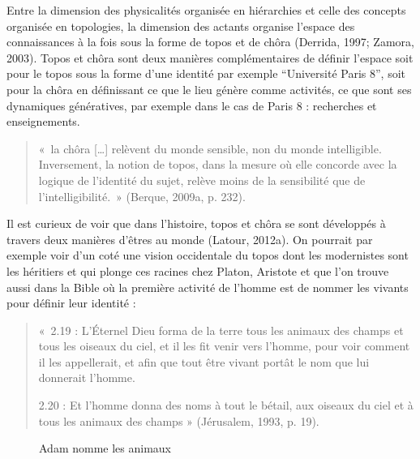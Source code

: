 \documentclass[
  a4paper,
  DIV=11,
  numbers=noendperiod]{scrreprt}
\begin{document}
Entre la dimension des physicalités organisée en hiérarchies et celle
des concepts organisée en topologies, la dimension des actants organise
l'espace des connaissances à la fois sous la forme de topos et de chôra
(Derrida, 1997; Zamora, 2003). Topos et chôra sont deux manières
complémentaires de définir l'espace soit pour le topos sous la forme
d'une identité par exemple ``Université Paris 8'', soit pour la chôra en
définissant ce que le lieu génère comme activités, ce que sont ses
dynamiques génératives, par exemple dans le cas de Paris 8 : recherches
et enseignements.

\begin{quote}
«~la chôra {[}\ldots{]} relèvent du monde sensible, non du monde
intelligible. Inversement, la notion de topos, dans la mesure où elle
concorde avec la logique de l'identité du sujet, relève moins de la
sensibilité que de l'intelligibilité.~» (Berque, 2009a, p. 232).
\end{quote}

Il est curieux de voir que dans l'histoire, topos et chôra se sont
développés à travers deux manières d'êtres au monde (Latour, 2012a). On
pourrait par exemple voir d'un coté une vision occidentale du topos dont
les modernistes sont les héritiers et qui plonge ces racines chez
Platon, Aristote et que l'on trouve aussi dans la Bible où la première
activité de l'homme est de nommer les vivants pour définir leur identité
:

\begin{quote}
«~2.19 : L'Éternel Dieu forma de la terre tous les animaux des champs et
tous les oiseaux du ciel, et il les fit venir vers l'homme, pour voir
comment il les appellerait, et afin que tout être vivant portât le nom
que lui donnerait l'homme.

2.20 : Et l'homme donna des noms à tout le bétail, aux oiseaux du ciel
et à tous les animaux des champs » (Jérusalem, 1993, p. 19).
\end{quote}

\begin{figure}


\caption{\label{fig-adamNomme}Adam nomme les animaux}

\end{figure}%
\end{document}
